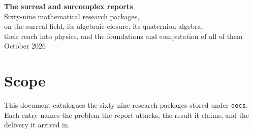 \documentclass[11pt]{article}
\newcommand{\dir}[1]{\texttt{#1}}
\begin{document}
\begin{center}
 {\LARGE\bfseries\color{Ink} The surreal and surcomplex reports}\\[8pt]
 {\large Sixty-nine mathematical research packages,\\
 on the surreal field, its algebraic closure, its quaternion algebra,\\
 their reach into physics, and the foundations and computation of all of them}\\[10pt]
 {\small October 2026}
\end{center}

\vspace{4pt}

\section*{Scope}

This document catalogues the sixty-nine research packages stored under
\dir{docs}.  Each entry names the problem the report attacks, the result it
claims, and the delivery it arrived in.
\end{document}

